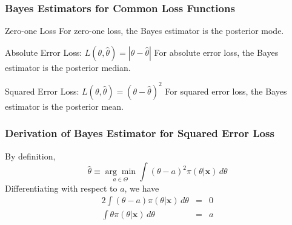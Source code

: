\begin{frame}
  \frametitle{Bayes Estimators for Common Loss Functions}
  
  \begin{block}{Zero-one Loss}
    For zero-one loss, the Bayes estimator is the posterior mode.
  \end{block}

  \begin{block}{Absolute Error Loss: $L(\theta, \widehat{\theta}) = |\theta - \widehat{\theta}|$}
    For absolute error loss, the Bayes estimator is the posterior median.
  \end{block}

  \begin{block}{Squared Error Loss: $L(\theta, \widehat{\theta}) = (\theta - \widehat{\theta})^2$}
    For squared error loss, the Bayes estimator is the posterior mean.
  \end{block}
\end{frame}
\begin{frame}
  \frametitle{Derivation of Bayes Estimator for Squared Error Loss}

  By definition,
  \[
    \widehat{\theta} \equiv \underset{a \in \Theta}{\arg \min} \int (\theta - a)^2 \pi(\theta|\mathbf{x})\, d\theta
  \]
  Differentiating with respect to $a$, we have
  \begin{eqnarray*}
    2\int (\theta - a)\pi(\theta|\mathbf{x})\, d\theta &=& 0\\
    \int \theta \pi(\theta|\mathbf{x})\, d\theta &=& a
  \end{eqnarray*}

\end{frame}
